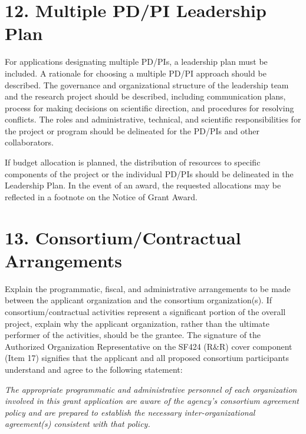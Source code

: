 \documentclass[11pt, notitlepage]{article} %
\begin{document}
\newpage

\section*{12. Multiple PD/PI Leadership Plan}

For applications designating multiple PD/PIs, a leadership plan must be included. A rationale for choosing a multiple PD/PI approach should be described. The governance and organizational structure of the leadership team and the research project should be described, including communication plans, process for making decisions on scientific direction, and procedures for resolving conflicts. The roles and administrative, technical, and scientific responsibilities for the project or program should be delineated for the PD/PIs and other collaborators.

If budget allocation is planned, the distribution of resources to specific components of the project or the individual PD/PIs should be delineated in the Leadership Plan. In the event of an award, the requested allocations may be reflected in a footnote on the Notice of Grant Award.


\newpage

\section*{13. Consortium/Contractual Arrangements}

Explain the programmatic, fiscal, and administrative arrangements to be made between the applicant organization and the consortium organization(s). If consortium/contractual activities represent a significant portion of the overall project, explain why the applicant organization, rather than the ultimate performer of the activities, should be the grantee. The signature of the Authorized Organization Representative on the SF424 (R\&R) cover component (Item 17) signifies that the applicant and all proposed consortium participants understand and agree to the following statement:

\emph{The appropriate programmatic and administrative personnel of each organization involved in this grant application are aware of the agency's consortium agreement policy and are prepared to establish the necessary inter-organizational agreement(s) consistent with that policy.}
\end{document}
